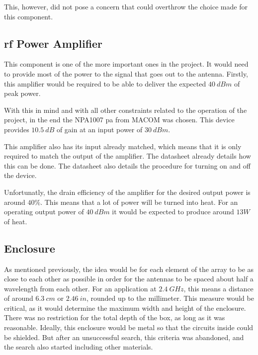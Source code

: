 \par This, however, did not pose a concern that could overthrow the choice made for this component.

\subsection{\textbf{\ac{rf} Power Amplifier}}
\par This component is one of the more important ones in the project. It would need to provide most of the power to the signal that goes out to the antenna. Firstly, this amplifier would be required to be able to deliver the expected $40 \:\si{dBm}$ of peak power.

\par With this in mind and with all other constraints related to the operation of the project, in the end the NPA1007 \ac{pa} from MACOM was chosen. This device provides $10.5 \:\si{dB}$ of gain at an input power of $30 \:\si{dBm}$.

\par This amplifier also has its input already matched, which means that it is only required to match the output of the amplifier. The datasheet already details how this can be done. The datasheet also details the procedure for turning on and off the device. 

\par Unfortunatly, the drain efficiency of the amplifier for the desired output power is around $40\%$. This means that a lot of power will be turned into heat. For an operating output power of $40 \:\si{dBm}$ it would be expected to produce around $13 W$ of heat.

\subsection{Enclosure}
\par As mentioned previously, the idea would be for each element of the array to be as close to each other as possible in order for the antennas to be spaced about half a wavelength from each other. For an application at $2.4 \:\si{GHz}$, this means a distance of around $6.3 \:\si{cm}$ or $2.46 \:\si{in}$, rounded up to the millimeter. This measure would be critical, as it would determine the maximum width and height of the enclosure. There was no restriction for the total depth of the box, as long as it was reasonable. Ideally, this enclosure would be metal so that the circuits inside could be shielded. But after an unsuccessful search, this criteria was abandoned, and the search also started including other materials.

